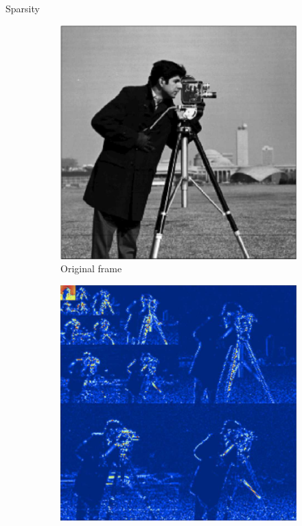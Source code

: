 \documentclass[final]{beamer}
\begin{document}
\begin{frame}{}
\begin{columns}[t]
\begin{column}{0.24\textwidth}
\begin{block}{Sparsity}
\begin{figure}[h]
  \centering
   \begin{subfigure}[b]{0.45\textwidth}
                \centering
                \includegraphics[width=\textwidth]{manoriginal}
                \caption{Original frame}
        \end{subfigure}
\quad
\begin{subfigure}[b]{0.45\textwidth}
                \centering
                \includegraphics[width=\textwidth]{manwavelet}

\end{subfigure}
\end{figure}
\end{block}
\end{column}
\end{columns}
\end{frame}
\end{document}
